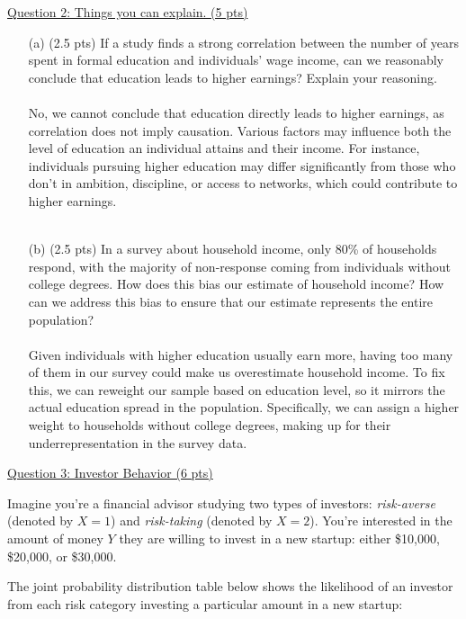 \documentclass{./../../Latex/tests}
\begin{document}
\newpage
\underline{Question 2: Things you can explain. (5 pts)}
\begin{enumerate}

\item[(a)] (2.5 pts) If a study finds a strong correlation between the number of years spent in formal education and individuals' wage income, can we reasonably conclude that education leads to higher earnings? Explain your reasoning. \\~\\
No, we cannot conclude that education directly leads to higher earnings, as correlation does not imply causation. Various factors may influence both the level of education an individual attains and their income. For instance, individuals pursuing higher education may differ significantly from those who don't in ambition, discipline, or access to networks, which could contribute to higher earnings.\\~\\


\item[(b)] (2.5 pts) In a survey about household income, only 80\% of households respond, with the majority of non-response coming from individuals without college degrees. How does this bias our estimate of household income? How can we address this bias to ensure that our estimate represents the entire population? \\~\\
Given individuals with higher education usually earn more, having too many of them in our survey could make us overestimate household income. To fix this, we can reweight our sample based on education level, so it mirrors the actual education spread in the population. Specifically, we can assign a higher weight to households without college degrees, making up for their underrepresentation in the survey data.
\end{enumerate}


\newpage
\underline{Question 3: Investor Behavior (6 pts)}

Imagine you're a financial advisor studying two types of investors: \textit{risk-averse} (denoted by $X=1$) and \textit{risk-taking} (denoted by $X=2$). You're interested in the amount of money $Y$ they are willing to invest in a new startup: either \$10,000, \$20,000, or \$30,000.

The joint probability distribution table below shows the likelihood of an investor from each risk category investing a particular amount in a new startup: \\
\end{document}
